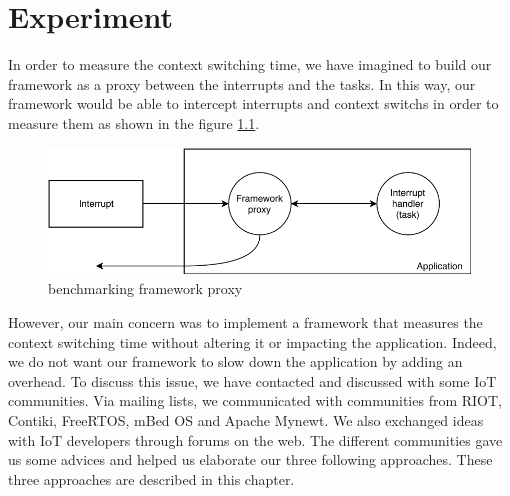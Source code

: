 \chapter{Experiment \label{chap:experiment}}

In order to measure the context switching time, we have imagined to build our framework as a proxy between the interrupts and the tasks.
In this way, our framework would be able to intercept interrupts and context switchs in order to measure them as shown in the figure \ref{fig:proxy-framework}.

\begin{figure}[!ht]
  \centering
  \includegraphics[scale=1]{assets/proxy-framework.pdf}
  \caption{benchmarking framework proxy\label{fig:proxy-framework}}
\end{figure}


However, our main concern was to implement a framework that measures the context switching time without altering it or impacting the application.
Indeed, we do not want our framework to slow down the application by adding an overhead.
To discuss this issue, we have contacted and discussed with some IoT communities.
Via mailing lists, we communicated with communities from RIOT, Contiki, FreeRTOS, mBed OS and Apache Mynewt.
We also exchanged ideas with IoT developers through forums on the web.
The different communities gave us some advices and helped us elaborate our three following approaches.
These three approaches are described in this chapter.



